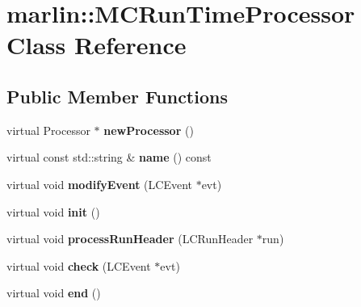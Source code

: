 \section{marlin::MCRunTimeProcessor Class Reference}
\label{classmarlin_1_1MCRunTimeProcessor}
\subsection*{Public Member Functions}
\begin{DoxyCompactItemize}
\item 
virtual Processor $\ast$ {\bfseries newProcessor} ()\label{classmarlin_1_1MCRunTimeProcessor_afaa7a8f8af2e6d40734992523adb0f18}

\item 
virtual const std::string \& {\bfseries name} () const \label{classmarlin_1_1MCRunTimeProcessor_a594976d07353672f85e23f50bc2c0183}

\item 
virtual void {\bfseries modifyEvent} (LCEvent $\ast$evt)\label{classmarlin_1_1MCRunTimeProcessor_a51c9d9bf4f8b66e2c3b82f31f0f26bba}

\item 
virtual void {\bfseries init} ()\label{classmarlin_1_1MCRunTimeProcessor_a645e036d00d0ac4f016a6fb8d33f40c1}

\item 
virtual void {\bfseries processRunHeader} (LCRunHeader $\ast$run)\label{classmarlin_1_1MCRunTimeProcessor_a94ffb5e4ec27a97de5a30bc5c43f0655}

\item 
virtual void {\bfseries check} (LCEvent $\ast$evt)\label{classmarlin_1_1MCRunTimeProcessor_afcac2282e9028e447afc453cb0f3cc5d}

\item 
virtual void {\bfseries end} ()\label{classmarlin_1_1MCRunTimeProcessor_a1b72a2ae28eb11cf4460b765a0ef0e01}

\end{DoxyCompactItemize}
